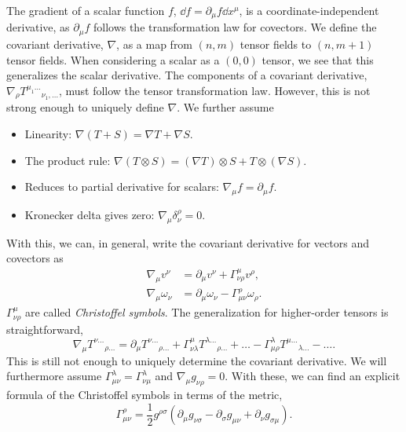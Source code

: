 The gradient of a scalar function $f$, $\dd f = \partial_\mu f \dd x^\mu$, is a coordinate-independent derivative, as $\partial_\mu f$ follows the transformation law for covectors.
We define the covariant derivative, $\nabla$, as a map from $(n, m)$ tensor fields to $(n, m+1)$ tensor fields.
When considering a scalar as a $(0, 0)$ tensor, we see that this generalizes the scalar derivative.
The components of a covariant derivative, $\nabla_\rho T^{\mu_1\dots}{}_{\nu_1, \dots}$, must follow the tensor transformation law. 
However, this is not strong enough to uniquely define $\nabla$.
We further assume
%
\begin{itemize}
    \item Linearity: $\nabla (T + S) = \nabla T + \nabla S$.
    \item The product rule: $\nabla (T \otimes S) = (\nabla T)\otimes S + T \otimes (\nabla S)$.
    \item Reduces to partial derivative for scalars: $\nabla_\mu f = \partial_\mu f$.
    \item Kronecker delta gives zero: $\nabla_\mu \delta^\rho_\nu = 0$.
\end{itemize}
%
With this, we can, in general, write the covariant derivative for vectors and covectors as~\autocite{carrollSpacetimeGeometryIntroduction2019}
%
\begin{align}
    \label{covariant derivative diff geom}
    \nabla_\mu v^\nu &= \partial_\mu v^\nu + \Gamma^\mu_{\nu \rho} v^\rho, \\
    \label{covariant derivative diff geom covector}
    \nabla_\mu \omega_\nu &= \partial_\mu \omega_\nu - \Gamma^\rho_{\mu \nu} \omega_\rho.
\end{align}
%
$\Gamma^{\mu}_{\nu \rho}$ are called \emph{Christoffel symbols}.
The generalization for higher-order tensors is straightforward, 
%
\begin{equation}
    \nabla_\mu T^{\nu\dots}{}_{\rho\dots}
    =
    \partial_\mu T^{\nu\dots}{}_{\rho\dots}
    + \Gamma^\mu_{\nu \lambda} T^{\lambda\dots}{}_{\rho\dots} +\dots
    - \Gamma^\lambda_{\mu \rho} T^{\mu\dots}{}_{\lambda\dots} -\dots.
\end{equation} 
%
This is still not enough to uniquely determine the covariant derivative.
We will furthermore assume $\Gamma^{\lambda}_{\mu \nu} = \Gamma^{\lambda}_{\nu \mu}$ and $\nabla_\mu g_{\nu \rho} = 0$.
With these, we can find an explicit formula of the Christoffel symbols in terms of the metric,
%
\begin{equation}
    \label{christoffel symbols from metric}
    \Gamma^\rho_{\mu \nu} = \frac{1}{2} g^{\rho \sigma} (\partial_\mu g_{\nu \sigma} - \partial_\sigma g_{\mu \nu} + \partial_{\nu}g_{\sigma \mu}).
\end{equation}
